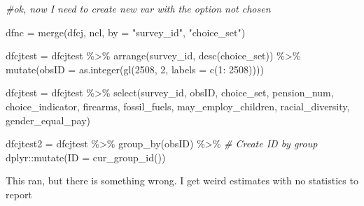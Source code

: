 \documentclass[
]{article}
\newenvironment{Shaded}{\begin{snugshade}}{\end{snugshade}}
\newcommand{\AttributeTok}[1]{\textcolor[rgb]{0.77,0.63,0.00}{#1}}
\newcommand{\CommentTok}[1]{\textcolor[rgb]{0.56,0.35,0.01}{\textit{#1}}}
\newcommand{\DecValTok}[1]{\textcolor[rgb]{0.00,0.00,0.81}{#1}}
\newcommand{\FunctionTok}[1]{\textcolor[rgb]{0.00,0.00,0.00}{#1}}
\newcommand{\NormalTok}[1]{#1}
\newcommand{\OtherTok}[1]{\textcolor[rgb]{0.56,0.35,0.01}{#1}}
\newcommand{\SpecialCharTok}[1]{\textcolor[rgb]{0.00,0.00,0.00}{#1}}
\newcommand{\StringTok}[1]{\textcolor[rgb]{0.31,0.60,0.02}{#1}}
\begin{document}
\begin{Shaded}
\begin{Highlighting}[]
\CommentTok{\#ok, now I need to create new var with the option not chosen}
\end{Highlighting}
\end{Shaded}

\begin{Shaded}
\begin{Highlighting}[]
\NormalTok{dfnc }\OtherTok{=} \FunctionTok{merge}\NormalTok{(dfcj, ncl, }\AttributeTok{by =} \StringTok{"survey\_id"}\NormalTok{, }\StringTok{"choice\_set"}\NormalTok{)}
\end{Highlighting}
\end{Shaded}

\begin{Shaded}
\begin{Highlighting}[]
\NormalTok{dfcjtest }\OtherTok{=}\NormalTok{ dfcjtest }\SpecialCharTok{\%\textgreater{}\%} 
  \FunctionTok{arrange}\NormalTok{(survey\_id, }\FunctionTok{desc}\NormalTok{(choice\_set)) }\SpecialCharTok{\%\textgreater{}\%} 
  \FunctionTok{mutate}\NormalTok{(}\AttributeTok{obsID =} \FunctionTok{as.integer}\NormalTok{(}\FunctionTok{gl}\NormalTok{(}\DecValTok{2508}\NormalTok{, }\DecValTok{2}\NormalTok{, }\AttributeTok{labels =} \FunctionTok{c}\NormalTok{(}\DecValTok{1}\SpecialCharTok{:} \DecValTok{2508}\NormalTok{))))}


\NormalTok{dfcjtest }\OtherTok{=}\NormalTok{ dfcjtest }\SpecialCharTok{\%\textgreater{}\%} 
  \FunctionTok{select}\NormalTok{(survey\_id, }
\NormalTok{         obsID, }
\NormalTok{         choice\_set, }
\NormalTok{         pension\_num,}
\NormalTok{         choice\_indicator, }
\NormalTok{         firearms,}
\NormalTok{         fossil\_fuels,}
\NormalTok{         may\_employ\_children,}
\NormalTok{         racial\_diversity,}
\NormalTok{         gender\_equal\_pay)}

\NormalTok{dfcjtest2 }\OtherTok{=}\NormalTok{ dfcjtest }\SpecialCharTok{\%\textgreater{}\%} 
  \FunctionTok{group\_by}\NormalTok{(obsID) }\SpecialCharTok{\%\textgreater{}\%} \CommentTok{\# Create ID by group}
\NormalTok{  dplyr}\SpecialCharTok{::}\FunctionTok{mutate}\NormalTok{(}\AttributeTok{ID =} \FunctionTok{cur\_group\_id}\NormalTok{())}
\end{Highlighting}
\end{Shaded}

This ran, but there is something wrong. I get weird estimates with no
statistics to report
\end{document}
